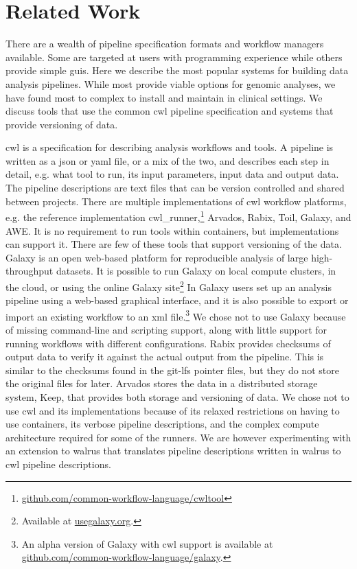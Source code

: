 \section{Related Work} 
There are a wealth of pipeline specification formats and workflow managers
available. Some are targeted at users with programming experience while others
provide simple \glspl{gui}.  Here we describe the most popular systems for
building data analysis pipelines. While most provide viable options for genomic
analyses, we have found most to complex to install and maintain in clinical
settings. We discuss tools that use the common \gls{cwl} pipeline specification
and systems that provide versioning of data. 

\gls{cwl} is a specification for describing analysis workflows and
tools.\cite{commonwl} A pipeline is written as a \gls{json} or \gls{yaml} file,
or a mix of the two, and describes each step in detail, e.g. what tool to run,
its input parameters, input data and output data. The pipeline descriptions are
text files that can be version controlled and shared between projects. There are
multiple implementations of \gls{cwl} workflow platforms, e.g. the reference
implementation
cwl\_runner,\footnote{\url{github.com/common-workflow-language/cwltool}}
Arvados,\cite{arvados} Rabix,\cite{rabix} Toil,\cite{toil} Galaxy,\cite{galaxy}
and AWE.\cite{awe} It is no requirement to run tools within containers, but
implementations can support it. There are few of these tools that support
versioning of the data. 
Galaxy is an
open web-based platform for reproducible analysis of large high-throughput
datasets.\cite{goecks2010galaxy} It is possible to run Galaxy on local compute
clusters, in the cloud, or using the online Galaxy site\footnote{Available at
\url{usegalaxy.org}.} In Galaxy users set up an analysis pipeline using a
web-based graphical interface, and it is also possible to export or import an
existing workflow to an \gls{xml} file.\footnote{An alpha version of Galaxy with
\gls{cwl} support is available at
\url{github.com/common-workflow-language/galaxy}.}  We chose not to use Galaxy
because of missing command-line and scripting support, along with little support
for running workflows with different configurations.\cite{spjuth2015experiences}
Rabix provides checksums of output data to verify it
against the actual output from the pipeline. This is similar to the checksums
found in the git-lfs pointer files, but they do not store the original files for
later. Arvados stores the data in a distributed storage system, Keep, that
provides both storage and versioning of data. We chose not to use \gls{cwl} and
its implementations because of its relaxed restrictions on having to use
containers, its verbose pipeline descriptions, and the complex compute
architecture required for some of the runners. We are however experimenting
with an extension to walrus that translates pipeline descriptions written in
walrus to \gls{cwl} pipeline descriptions. 

